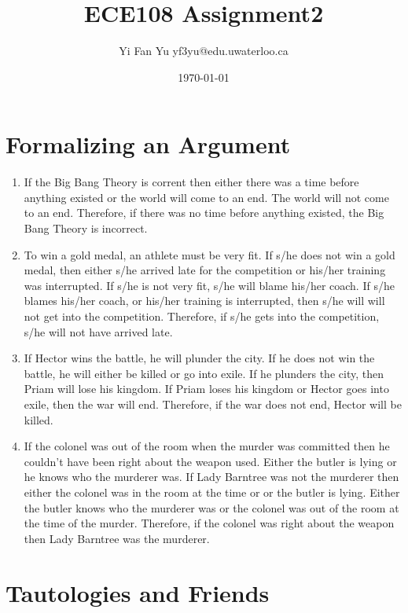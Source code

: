 \documentclass[a4paper,12pt]{article}
\begin{document}
\title{ECE108 Assignment2}
\author{Yi Fan Yu yf3yu@edu.uwaterloo.ca}
\date{\today}
\maketitle

\tableofcontents
\newpage

\section{Formalizing an Argument}
\begin{enumerate}
\item If the Big Bang Theory is corrent then either there was a time before anything existed or the world will come to an end.  The world will not come to an end.  Therefore, if there was no time before anything existed, the Big Bang Theory is incorrect.
\item To win a gold medal, an athlete must be very fit.  If s/he does not win a gold medal, then either s/he arrived late for the competition or his/her training was interrupted.  If s/he is not very fit, s/he will blame his/her coach.  If s/he blames his/her coach, or his/her training is interrupted, then s/he will will not get into the competition.  Therefore, if s/he gets into the competition, s/he will not have arrived late.
\item If Hector wins the battle, he will plunder the city.  If he does not win the battle, he will either be killed or go into exile.  If he plunders the city, then Priam will lose his kingdom.  If Priam loses his kingdom or Hector goes into exile, then the war will end.  Therefore, if the war does not end, Hector will be killed.
\item If the colonel was out of the room when the murder was committed then he couldn't have been right about the weapon used.  Either the butler is lying or he knows who the murderer was.  If Lady Barntree was not the murderer then either the colonel was in the room at the time or or the butler is lying.  Either the butler knows who the murderer was or the colonel was out of the room at the time of the murder.  Therefore, if the colonel was right about the weapon then Lady Barntree was the murderer.
\end{enumerate}
\section{Tautologies and Friends}
\end{document}
